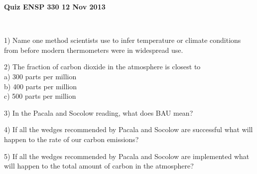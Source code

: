 \documentclass[12pt, oneside]{article}
\newif\ifsolution
\newcommand{\solution}[1]
{\ifsolution
Answer: {\it #1}
\else\fi}
\begin{document}
{\bf Quiz \hfill ENSP 330 \hfill 12 Nov 2013 }

\framebox[4.5in]{\rule{0cm}{1.5cm}}\\

\vfill

1) Name one method scientists use to infer temperature or climate
conditions from before
modern thermometers were in widespread use.

\solution{Tree rings, ice cores, pollen, coral, or others}

\vfill
2) The fraction of carbon dioxide in the atmosphere is closest to\\
a) 300 parts per million \\
b) 400 parts per million \\
c) 500 parts per million

\solution{b. as of 9 Nov 2013, Mauna Loa Observatory reads 394.57 ppm}

\vfill
3) In the Pacala and Socolow reading, what does BAU mean?

\solution{Business as usual.  Specifically, this is the amount of carbon
emissions if we do nothing different and continue economic growth.}

\vfill
4) If all the wedges recommended by Pacala and Socolow are successful what
will happen to the rate of our carbon emissions?

\solution{The goal of the wedges is to hold carbon emissions for the
next 50 years to the level they are now, approximately 7 GtC per year.}

\vfill
5) If all the wedges recommended by Pacala and Socolow are implemented
what will happen to the total amount of carbon in the atmosphere?

\solution{The goal is to prevent total carbon dioxide levels from
exceeding 500 ppm.}

\vfill
\end{document}
